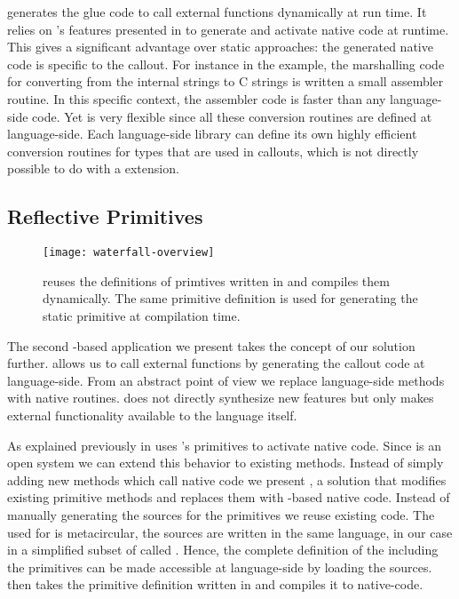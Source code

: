 \NB generates the glue code to call external functions dynamically at run time.
It relies on \B's features presented in  to generate and activate native code at runtime.
This gives \NB a significant advantage over static approaches: the generated native code is specific to the callout.
For instance in the  example, the marshalling code for converting from the internal \PH strings to C strings is written a small assembler routine.
In this specific context, the assembler code is faster than any language-side code.
Yet \NB is very flexible since all these conversion routines are defined at language-side. 
Each language-side library can define its own highly efficient conversion routines for types that are used in \FFI callouts, which is not directly possible to do with a \VM extension.


\subsection{Reflective Primitives}

\begin{figure}[h]
	\centering
	\texttt{[image: waterfall-overview]}
	\caption[\WF Overview]{\WF reuses the definitions of \VM primtives written in \Slang and compiles them dynamically. The same primitive definition is used for generating the static primitive at \VM compilation time.}
\end{figure}

\noindent The second \B-based application we present takes the concept of our \FFI solution further.
\NB allows us to call external functions by generating the callout code at language-side.
From an abstract point of view we replace language-side methods with native routines.
\NB does not directly synthesize new features but only makes external functionality available to the language itself.

As explained previously in  \B uses \PH's primitives to activate native code.
Since \PH is an open system we can extend this behavior to existing methods.
Instead of simply adding new methods which call native code we present \WF, a solution that modifies existing primitive methods and replaces them with \B-based native code.
Instead of manually generating the sources for the primitives we reuse existing code.
The \VM used for \PH is metacircular, the \VM sources are written in the same language, in our case in a simplified subset of \PH called \Slang.
Hence, the complete definition of the \VM including the primitives can be made accessible at language-side by loading the \VM sources.
\WF then takes the primitive definition written in \Slang and compiles it to native-code.

